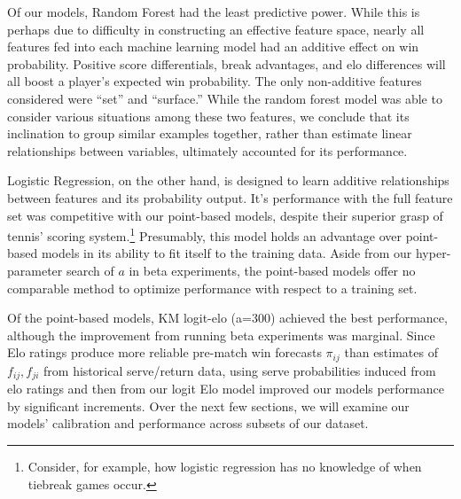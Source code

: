\documentclass[chapterprefix=false]{report}
\begin{document}
Of our models, Random Forest had the least predictive power. While this is perhaps due to difficulty in constructing an effective feature space, nearly all features fed into each machine learning model had an additive effect on win probability. Positive score differentials, break advantages, and elo differences will all boost a player's expected win probability. The only non-additive features considered were ``set'' and ``surface.'' While the random forest model was able to consider various situations among these two features, we conclude that its inclination to group similar examples together, rather than estimate linear relationships between variables, ultimately accounted for its performance.


Logistic Regression, on the other hand, is designed to  learn additive relationships between features and its probability output. It's performance with the full feature set was competitive with our point-based models, despite their superior grasp of tennis' scoring system.\footnote{Consider, for example, how logistic regression has no knowledge of when tiebreak games occur.} Presumably, this model holds an advantage over point-based models in its ability to fit itself to the training data. Aside from our hyper-parameter search of $a$ in beta experiments, the point-based models offer no comparable method to optimize performance with respect to a training set.


Of the point-based models, KM logit-elo (a=300) achieved the best performance, although the improvement from running beta experiments was marginal. Since Elo ratings produce more reliable pre-match win forecasts $\pi_{ij}$ than estimates of $f_{ij},f_{ji}$ from historical serve/return data, using serve probabilities induced from elo ratings and then from our logit Elo model improved our models performance by significant increments. Over the next few sections, we will examine our models' calibration and performance across subsets of our dataset.
\end{document}
